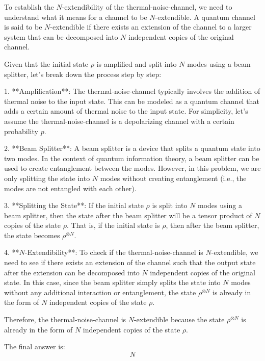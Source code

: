 To establish the \( N \)-extendibility of the thermal-noise-channel, we need to understand what it means for a channel to be \( N \)-extendible. A quantum channel is said to be \( N \)-extendible if there exists an extension of the channel to a larger system that can be decomposed into \( N \) independent copies of the original channel.

Given that the initial state \(\rho\) is amplified and split into \( N \) modes using a beam splitter, let's break down the process step by step:

1. **Amplification**: The thermal-noise-channel typically involves the addition of thermal noise to the input state. This can be modeled as a quantum channel that adds a certain amount of thermal noise to the input state. For simplicity, let's assume the thermal-noise-channel is a depolarizing channel with a certain probability \( p \).

2. **Beam Splitter**: A beam splitter is a device that splits a quantum state into two modes. In the context of quantum information theory, a beam splitter can be used to create entanglement between the modes. However, in this problem, we are only splitting the state into \( N \) modes without creating entanglement (i.e., the modes are not entangled with each other).

3. **Splitting the State**: If the initial state \(\rho\) is split into \( N \) modes using a beam splitter, then the state after the beam splitter will be a tensor product of \( N \) copies of the state \(\rho\). That is, if the initial state is \(\rho\), then after the beam splitter, the state becomes \(\rho^{\otimes N}\).

4. **\( N \)-Extendibility**: To check if the thermal-noise-channel is \( N \)-extendible, we need to see if there exists an extension of the channel such that the output state after the extension can be decomposed into \( N \) independent copies of the original state. In this case, since the beam splitter simply splits the state into \( N \) modes without any additional interaction or entanglement, the state \(\rho^{\otimes N}\) is already in the form of \( N \) independent copies of the state \(\rho\).

Therefore, the thermal-noise-channel is \( N \)-extendible because the state \(\rho^{\otimes N}\) is already in the form of \( N \) independent copies of the state \(\rho\).

The final answer is:
\[
\boxed{N}
\]